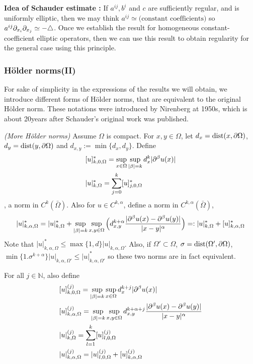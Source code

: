 \documentclass[12pt,a4paper]{article}
\begin{document}
\textbf{Idea of Schauder estimate :} If $a^{ij},b^i$ and $c$ are sufficiently regular, and is uniformly elliptic, then we may think  $a^{ij}\simeq \text{(constant coefficients)}$ so $a^{ij} \partial_{x_i} \partial_{x_j} \simeq -\triangle$. Once we establish the result for homogeneous constant-coefficient elliptic operators, then we can use this result to obtain regularity for the general case using this principle.
\s

\subsubsection*{H\"older norms(II)}

For sake of simplicity in the expressions of the results we will obtain, we introduce different forms of H\"older norms, that are equivalent to the original H\"older norm. These notations were introduced by Nirenberg at 1950s, which is about 20years after Schauder's original work was published.
\s

 \emph{(More H\"older norms)} Assume $\Omega$ is compact. For $x,y\in \Omega$, let $d_x = \text{dist}(x, \partial \Omega)$, $d_y = \text{dist}(y, \partial \Omega)$ and $d_{x,y} := \min \{d_x,d_y\}$. Define
\begin{align*}
& [ u ]^*_{k,0, \Omega} = \sup_{x\in \Omega} \sup_{|\beta|=k} d^k_{x} |\partial^{\beta} u(x)|\\
& |u|^*_{k, \Omega}= \sum_{j=0}^k [u]^*_{j,0,\Omega}
\end{align*}
, a norm in $C^k(\bar{\Omega})$. Also for $u\in C^{k, \alpha}$, define a norm in $C^{k, \alpha}(\bar{\Omega})$,
\begin{align*}
|u|^*_{k, \alpha, \Omega} = |u|^*_{k, \Omega} + \sup_{|\beta| =k} \sup_{x,y\in \Omega} \Big( d_{x,y}^{k+\alpha} \frac{|\partial^{\beta} u(x) - \partial^{\beta} u(y)|}{|x-y|^{\alpha}} \Big) =: |u|^*_{k, \Omega} +[u]^*_{k, \alpha, \Omega}
\end{align*}
Note that $|u|^*_{k, \alpha, \Omega} \leq \max\{1, d\} |u|_{k,\alpha, \Omega}$. Also, if $\Omega ' \subset \Omega$, $\sigma = \text{dist}(\Omega', \partial \Omega)$, $\min \{1. \sigma^{k+\alpha}\} |u|_{k, \alpha, \Omega'} \leq |u|^*_{k, \alpha, \Omega'}$ so these two norms are in fact equivalent.
\s

For all $j\in \mathbb{N}$, also define
\begin{align*}
&[u]^{(j)}_{k,0, \Omega} = \sup_{|\beta|=k} \sup_{x\in \Omega} d^{k+j}_{x} |\partial^{\beta} u(x)| \\
&[u]^{(j)}_{k, \alpha,\Omega} = \sup_{|\beta| =k} \sup_{x,y\in \Omega} d^{k+\alpha +j}_{x,y} \frac{|\partial^{\beta} u(x) - \partial^{\beta}u(y)|}{|x-y|^{\alpha}} \\
&|u|^{(j)}_{k,\Omega} =\sum_{l=1}^k [u]^{(j)}_{l, 0, \Omega}\\
& |u|^{(j)}_{k, \alpha, \Omega} = |u|^{(j)}_{l, 0, \Omega} + [u]^{(j)}_{k, \alpha, \Omega}
\end{align*}
\s
\end{document}

